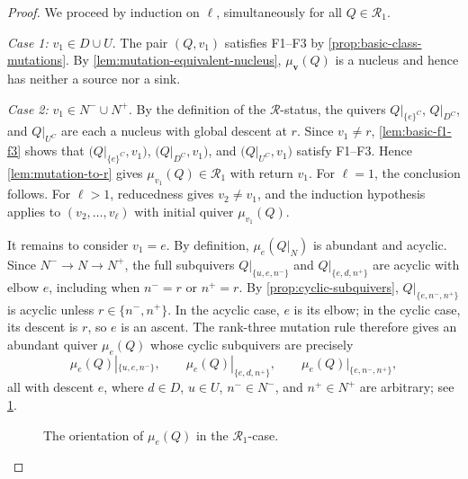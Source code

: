 \documentclass[10pt,a4paper]{amsart}
\theoremstyle{definition}
\theoremstyle{definition}
\numberwithin{equation}{section}
\numberwithin{table}{section}
\newcommand{\nminus}{N^{-}}
\newcommand{\nplus}{N^{+}}
\newcommand{\Rclass}{\mathcal{R}}
\newcommand{\fivecoords}{%
  \coordinate (cm) at (-1.85,0.00);
  \coordinate (e)  at (-0.67,1.18);
  \coordinate (w)  at ( 0.67,1.18);
  \coordinate (cp) at ( 1.85,0.00);
  \coordinate (d)  at (0,-1.05);
}
\begin{document}
\begin{proof}
We proceed by induction on $\ell$, simultaneously for all $Q\in\Rclass_1$.

\emph{Case 1:} $v_1\in D\cup U$.
The pair $(Q,v_1)$ satisfies F1--F3 by
\cref{prop:basic-class-mutations}. By \cref{lem:mutation-equivalent-nucleus},
$\mu_{\mathbf v}(Q)$ is a nucleus and hence has neither a source nor a sink.

\emph{Case 2:} $v_1\in\nminus\cup\nplus$.
By the definition of the $\Rclass$-status, the quivers
$Q|_{\{e\}^C}$, $Q|_{D^C}$, and $Q|_{U^C}$ are each a nucleus with global
descent at $r$. Since $v_1\ne r$, \cref{lem:basic-f1-f3} shows that
$\bigl(Q|_{\{e\}^C},v_1\bigr)$, $\bigl(Q|_{D^C},v_1\bigr)$, and
$\bigl(Q|_{U^C},v_1\bigr)$ satisfy F1--F3. Hence
\cref{lem:mutation-to-r} gives $\mu_{v_1}(Q)\in\Rclass_1$ with return $v_1$.
For $\ell=1$, the conclusion follows. For $\ell>1$, reducedness gives
$v_2\ne v_1$, and the induction hypothesis applies to $(v_2,\ldots,v_\ell)$
with initial quiver $\mu_{v_1}(Q)$.

It remains to consider $v_1=e$. By definition, $\mu_e(Q|_N)$ is abundant and
acyclic. Since
$\nminus\to N\to\nplus$, the full subquivers
$Q|_{\{u,e,n^-\}}$ and $Q|_{\{e,d,n^+\}}$ are acyclic with elbow $e$,
including when $n^-=r$ or $n^+=r$. By \cref{prop:cyclic-subquivers},
$Q|_{\{e,n^-,n^+\}}$ is acyclic unless $r\in\{n^-,n^+\}$. In the acyclic
case, $e$ is its elbow; in the cyclic case, its descent is $r$, so $e$ is an
ascent. The rank-three mutation rule therefore gives an abundant quiver
$\mu_e(Q)$ whose cyclic subquivers are
precisely
\[
\mu_e(Q)|_{\{u,e,n^-\}},\qquad
\mu_e(Q)|_{\{e,d,n^+\}},\qquad
\mu_e(Q)|_{\{e,n^-,n^+\}},
\]
all with descent $e$, where $d\in D$, $u\in U$, $n^-\in\nminus$, and
$n^+\in\nplus$ are arbitrary; see \cref{fig:one-nucleus-transition}.

\begin{figure}[H]
\centering
{}
\caption{The orientation of $\mu_e(Q)$ in the $\Rclass_1$-case.}
\label{fig:one-nucleus-transition}
\end{figure}


\end{proof}
\end{document}
